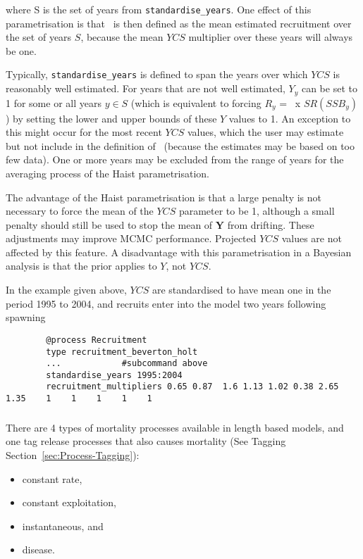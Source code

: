 where S is the set of years from \texttt{standardise\_years}. One effect of this parametrisation is that \Rzero\ is then defined as the mean estimated recruitment over the set of years $S$, because the mean $YCS$ multiplier over these years will always be one.

Typically, \texttt{standardise\_years} is defined to span the years over which $YCS$ is reasonably well estimated. For years that are not well estimated, $Y_y$ can be set to 1 for some or all years $y\in S$ (which is equivalent to forcing $R_y$ = \Rzero\ x $SR(SSB_y)$) by setting the lower and upper bounds of these $Y$ values to 1. An exception to this might occur for the most recent $YCS$ values, which the user may estimate but not include in the definition of \Rzero\ (because the estimates may be based on too few data). One or more years may be excluded from the range of years for the averaging process of the Haist parametrisation.

The advantage of the Haist parametrisation is that a large penalty is not necessary to force the mean of the $YCS$ parameter to be 1, although a small penalty should still be used to stop the mean of \textbf{Y} from drifting. These adjustments may improve MCMC performance. Projected $YCS$ values are not affected by this feature. A disadvantage with this parametrisation in a Bayesian analysis is that the prior applies to $Y$, not $YCS$.

In the  example given above, $YCS$ are standardised to have mean one in the period 1995 to 2004, and recruits enter into the model two years following spawning

{\small{\begin{verbatim}
		@process Recruitment
		type recruitment_beverton_holt
		...            #subcommand above
		standardise_years 1995:2004
		recruitment_multipliers 0.65 0.87  1.6 1.13 1.02 0.38 2.65 1.35    1    1    1    1    1
		\end{verbatim}}}


\subsubsection{\label{sec:Process-Mortality}}

There are 4 types of mortality processes available in \CNAME length based models, and one tag release processes that also causes mortality (See Tagging Section~\ref{sec:Process-Tagging}):

\begin{itemize}
	\item constant rate,
	\item constant exploitation,
	\item instantaneous, and
	\item disease.
\end{itemize}

